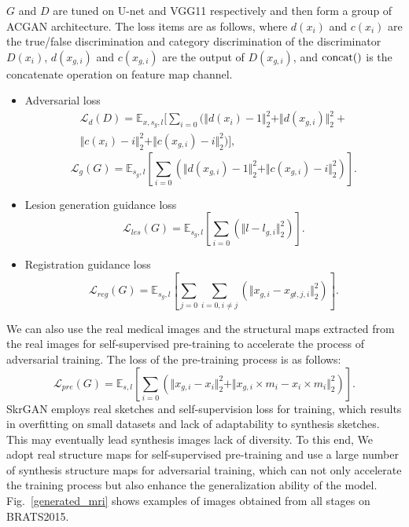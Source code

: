 \documentclass[runningheads]{llncs}
\begin{document}
	$G$ and $D$ are tuned on U-net and VGG11 respectively and then form a group of ACGAN\cite{98odena2016conditional} architecture. The loss items are as follows, where $d(x_{i})$ and $c(x_{i})$ are the true/false discrimination and category discrimination of the discriminator $D(x_i)$, $d(x_{g, i})$ and $c(x_{g,i})$ are the output of $D(x_{g,i})$, and ${\rm concat}()$ is the concatenate operation on feature map channel. 
	\begin{itemize}
		\item{Adversarial loss}
		\begin{equation}
		\begin{split}
		\mathcal{L}_{d}(D)=\mathbb{E}_{x,s_g,l}[\sum\limits_{i=0}(\Vert{d(x_i)-1}\Vert_{2}^{2}+\Vert{d(x_{g,i})}\Vert_{2}^{2}+\\
		\Vert{c(x_i)-i}\Vert_{2}^{2}+\Vert{c(x_{g,i})-i}\Vert_{2}^{2})],
		\end{split}
		\end{equation}
		\begin{equation}
		\mathcal{L}_{g}(G)=\mathbb{E}_{s_g,l}[\sum\limits_{i=0}(\Vert{d(x_{g,i})-1}\Vert_{2}^{2}+\Vert{c(x_{g,i})-i}\Vert_{2}^{2})].
		\end{equation}
		\item{Lesion generation guidance loss}
		\begin{equation}
		\mathcal{L}_{les}(G)=\mathbb{E}_{s_g,l}[\sum\limits_{i=0}(\Vert{l-l_{g,i}}\Vert_{2}^{2})].
		\end{equation}
		\item{Registration guidance loss}
		\begin{equation}
		\mathcal{L}_{reg}(G)=\mathbb{E}_{s_g,l}[\sum\limits_{j=0}\sum\limits_{i=0,i\neq j}(\Vert{x_{g,i}-x_{gt,j,i}}\Vert_{2}^{2})].
		\end{equation}
	\end{itemize}
	We can also use the real medical images and the structural maps extracted from the real images for self-supervised pre-training to accelerate the process of adversarial training. The loss of the pre-training process is as follows:
	\begin{equation}
	\mathcal{L}_{pre}(G)=\mathbb{E}_{s,l}[\sum\limits_{i=0}(\Vert{x_{g,i}-x_i}\Vert_{2}^{2}+\Vert{x_{g,i}\times m_i-x_{i}\times m_i}\Vert_{2}^{2})].
	\end{equation}
	SkrGAN\cite{96zhang2019skrgan:} employs real sketches and self-supervision loss for training, which results in overfitting on small datasets and lack of adaptability to synthesis sketches. This may eventually lead synthesis images lack of diversity. To this end, We adopt real structure maps for self-supervised pre-training and use a large number of synthesis structure maps for adversarial training, which can not only accelerate the training process but also enhance the generalization ability of the model. Fig.~\ref{generated_mri} shows examples of images obtained from all stages on BRATS2015.
\end{document}
